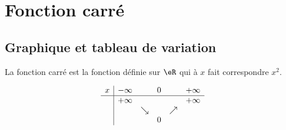 
\section{Fonction carré}

\subsection{Graphique et tableau de variation}

La fonction carré est la fonction définie sur \( \eR\) qui à \( x\) fait correspondre \( x^2\).

\begin{multicols}{2}

        \begin{equation*}
            \begin{array}[]{c|ccccc}
                x&-\infty&&0&&+\infty\\
                \hline
                &+\infty&&&&+\infty\\
                &&\searrow&&\nearrow&\\
                &&&0&&
            \end{array}
        \end{equation*}

        \columnbreak

        \begin{center}

        \end{center}

\end{multicols}

